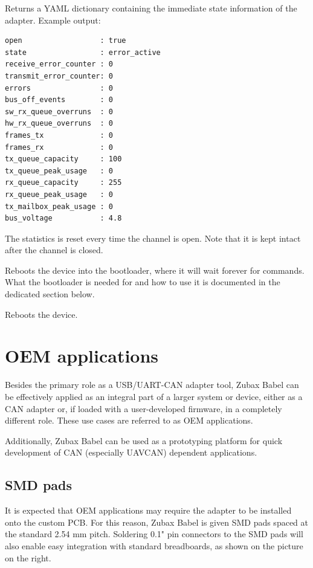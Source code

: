 \documentclass{zubaxdoc}
\begin{document}

Returns a YAML dictionary containing the immediate state information of the adapter. Example output:

\begin{verbatim}
open                  : true
state                 : error_active
receive_error_counter : 0
transmit_error_counter: 0
errors                : 0
bus_off_events        : 0
sw_rx_queue_overruns  : 0
hw_rx_queue_overruns  : 0
frames_tx             : 0
frames_rx             : 0
tx_queue_capacity     : 100
tx_queue_peak_usage   : 0
rx_queue_capacity     : 255
rx_queue_peak_usage   : 0
tx_mailbox_peak_usage : 0
bus_voltage           : 4.8
\end{verbatim}

The statistics is reset every time the channel is open. Note that it is kept intact after the channel is closed.


Reboots the device into the bootloader, where it will wait forever for commands. What the bootloader is needed for and how to use it is documented in the dedicated section below.


Reboots the device.

\chapter{OEM applications}\label{sec:oem_applications}

Besides the primary role as a USB/UART-CAN adapter tool, Zubax Babel can be effectively applied as an integral part of a larger system or device, either as a CAN adapter or, if loaded with a user-developed firmware, in a completely different role. These use cases are referred to as OEM applications.

Additionally, Zubax Babel can be used as a prototyping platform for quick development of CAN (especially UAVCAN) dependent applications.

\section{SMD pads}

It is expected that OEM applications may require the adapter to be installed onto the custom PCB. For this reason, Zubax Babel is given SMD pads spaced at the standard 2.54 mm pitch. Soldering 0.1" pin connectors to the SMD pads will also enable easy integration with standard breadboards, as shown on the picture on the right.
\end{document}
